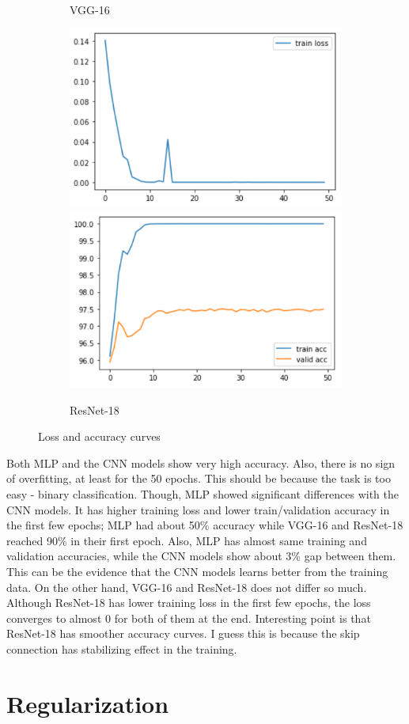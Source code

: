 \documentclass[11pt]{article}
\begin{document}
\begin{figure}[H]
\begin{subfigure}[H]{1\textwidth}
            \caption{VGG-16}\vspace{2mm}
        \end{subfigure}
        \begin{subfigure}[H]{1\textwidth}
            \includegraphics[width=0.5\linewidth]{img/Res/loss.PNG}
            \includegraphics[width=0.5\linewidth]{img/Res/acc.PNG}
            \caption{ResNet-18}
        \end{subfigure}
        \caption{Loss and accuracy curves}
        \label{fig4}
    \end{figure}
    Both MLP and the CNN models show very high accuracy. Also, there is no sign of overfitting, at least for the 50 epochs. This should be because the task is too easy - binary classification.
    Though, MLP showed significant differences with the CNN models. It has higher training loss and lower train/validation accuracy in the first few epochs; MLP had about 50\% accuracy while VGG-16 and ResNet-18 reached 90\% in their first epoch. Also, MLP has almost same training and validation accuracies, while the CNN models show about 3\% gap between them. This can be the evidence that the CNN models learns better from the training data. On the other hand, VGG-16 and ResNet-18 does not differ so much. Although ResNet-18 has lower training loss in the first few epochs, the loss converges to almost 0 for both of them at the end. Interesting point is that ResNet-18 has smoother accuracy curves. I guess this is because the skip connection has stabilizing effect in the training.

\section{Regularization}
\setcounter{subsection}{-1}
\end{document}

